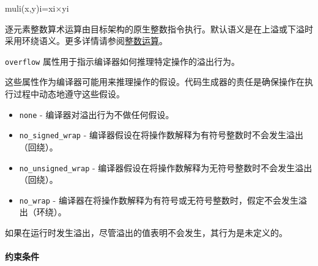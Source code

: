 \documentclass{article}
\begin{document}
muli(x,y)i=xi×yi


逐元素整数算术运算由目标架构的原生整数指令执行。默认语义是在上溢或下溢时采用环绕语义。更多详情请参阅\href{https://docs.nvidia.com/cuda/tile-ir/latest/sections/operations.html#op-group-integer}{整数运算}。



\texttt{overflow} 属性用于指示编译器如何推理特定操作的溢出行为。



这些属性作为编译器可能用来推理操作的假设。代码生成器的责任是确保操作在执行过程中动态地遵守这些假设。



\begin{itemize}
\item \texttt{none} - 编译器对溢出行为不做任何假设。
\item \texttt{no\_signed\_wrap} - 编译器假设在将操作数解释为有符号整数时不会发生溢出（回绕）。
\item \texttt{no\_unsigned\_wrap} - 编译器假设在将操作数解释为无符号整数时不会发生溢出（回绕）。
\item \texttt{no\_wrap} - 编译器在将操作数解释为有符号或无符号整数时，假定不会发生溢出（环绕）。


\end{itemize}
如果在运行时发生溢出，尽管溢出的值表明不会发生，其行为是未定义的。





\paragraph{约束条件}
\end{document}
